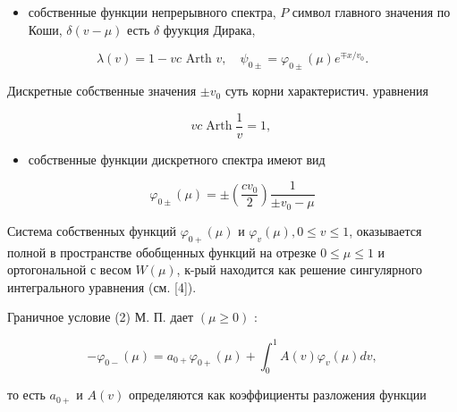 \documentclass[10pt]{article}
\begin{document}
\begin{itemize}

  \item собственные функции непрерывного спектра, $P$ символ главного значения по Коши, $\delta(v-\mu)$ есть $\delta$ фуукция Дирака,

\end{itemize}



\[

\lambda(v)=1-v c \text { Arth } v, \quad \psi_{0 \pm}=\varphi_{0 \pm}(\mu) e^{\mp x / v_{0}} .

\]



Дискретные собственные значения $\pm v_{0}$ суть корни характеристич. уравнения



\[

v c \operatorname{Arth} \frac{1}{v}=1 \text {, }

\]



\begin{itemize}

  \item собственные функции дискретного спектра имеют вид

\end{itemize}



\[

\varphi_{0 \pm}(\mu)= \pm\left(\frac{c v_{0}}{2}\right) \frac{1}{ \pm v_{0}-\mu}

\]



Система собственных функций $\varphi_{0+}(\mu)$ и $\varphi_{v}(\mu), 0 \leqslant v \leqslant 1$, оказывается полной в пространстве обобщенных функций на отрезке $0 \leqslant \mu \leqslant 1$ и ортогональной с весом $W(\mu)$, к-рый находится как решение сингулярного интегрального уравнения (см. [4]).



Граничное условие (2) М. П. дает $(\mu \geqslant 0)$ :



\[

-\varphi_{0-}(\mu)=a_{0+} \varphi_{0+}(\mu)+\int_{0}^{1} A(v) \varphi_{v}(\mu) d v,

\]



то есть $a_{0+}$ и $A(v)$ определяются как коэффициенты разложения функции
\end{document}
